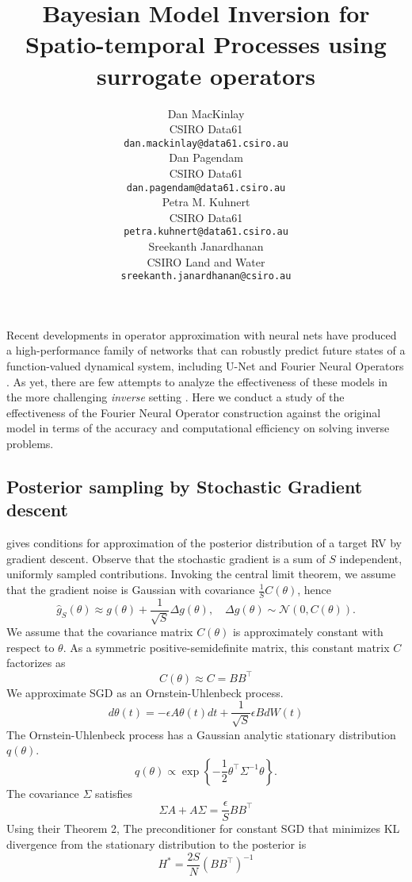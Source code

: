 \documentclass{article}
\title{Bayesian Model Inversion for Spatio-temporal Processes using surrogate operators}
\author{%
  Dan MacKinlay\\
  CSIRO Data61\\
  \texttt{dan.mackinlay@data61.csiro.au} \\
   \And
   Dan Pagendam \\
   CSIRO Data61 \\
  \texttt{dan.pagendam@data61.csiro.au} \\
   \And
   Petra M. Kuhnert \\
   CSIRO Data61 \\
   \texttt{petra.kuhnert@data61.csiro.au} \\
   Sreekanth Janardhanan\\
   CSIRO Land and Water \\
   \texttt{sreekanth.janardhanan@csiro.au} \\
}
\begin{document}
\maketitle

\begin{abstract}

\end{abstract}

Recent developments in operator approximation with neural nets have produced a high-performance family of networks that can robustly predict future states of a function-valued dynamical system, including U-Net \cite{RonnebergerUNet2015} and Fourier Neural Operators \cite{LiFourier2020,KovachkiNeural2021}.
As yet, there are few attempts to analyze the effectiveness of these models in the more challenging \emph{inverse} setting \cite{MacKinlayModel2021}.
Here we conduct a study of the effectiveness of the Fourier Neural Operator construction against the original model in terms of the accuracy and computational efficiency on solving inverse problems.


 \subsection{Posterior sampling by Stochastic Gradient descent}
 
\cite{MandtStochastic2017} gives conditions for approximation of the posterior distribution of a target RV by gradient descent.
Observe that the stochastic gradient is a sum of \(S\) independent, uniformly sampled contributions. Invoking the central limit theorem, we assume that the gradient noise is Gaussian with covariance \(\frac{1}{S} C(\theta)\), hence
\[
\hat{g}_S(\theta) \approx g(\theta)+\frac{1}{\sqrt{S}} \Delta g(\theta), \quad \Delta g(\theta) \sim \mathcal{N}(0, C(\theta)) .
\]
We assume that the covariance matrix \(C(\theta)\) is approximately constant with respect to \(\theta\).
As a symmetric positive-semidefinite matrix, this constant matrix \(C\) factorizes as
\[
C(\theta) \approx C=B B^{\top}
\]
We approximate SGD as an Ornstein-Uhlenbeck process. 
\[
d \theta(t)=-\epsilon A \theta(t) d t+\frac{1}{\sqrt{S}} \epsilon B d W(t)
\]
The Ornstein-Uhlenbeck process has a Gaussian analytic stationary distribution \(q(\theta)\). 
\[
q(\theta) \propto \exp \left\{-\frac{1}{2} \theta^{\top} \Sigma^{-1} \theta\right\} .
\]
The covariance \(\Sigma\) satisfies
\[
\Sigma A+A \Sigma=\frac{\epsilon}{S} B B^{\top}
\]
Using their Theorem 2, The preconditioner for constant SGD that minimizes KL divergence from the stationary distribution to the posterior is
\[
H^*=\frac{2 S}{N}\left(B B^{\top}\right)^{-1}
\]
\end{document}
